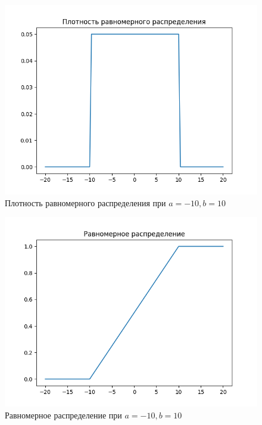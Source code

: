 \documentclass[a4paper, 14pt]{article}
\begin{document}
\begin{figure}[H]
    \includegraphics[scale=0.8]{-10_10_uniform_density.png}
    \caption{Плотность равномерного распределения при $a = -10, b = 10$}
\end{figure}

\begin{figure}[H]
    \includegraphics[scale=0.8]{-10_10_uniform.png}
    \caption{Равномерное распределение при $a = -10, b = 10$}
\end{figure}
\end{document}
